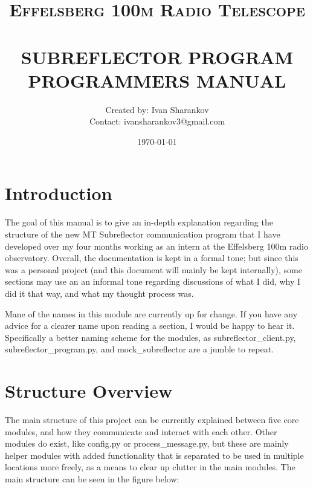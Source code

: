\documentclass{article}
\title{ \normalsize \textsc{Effelsberg 100m Radio Telescope}
		\\ [2.0cm]
		\HRule{0.5pt} \\
		\LARGE \textbf{\uppercase{Subreflector Program \\Programmers Manual}}
		\HRule{2pt} \\ [0.5cm]
		}
\author{
		Created by: Ivan Sharankov \\ 
		Contact: ivansharankov3@gmail.com \\
		}
\date{\today}
\begin{document}
\maketitle
\newpage

\tableofcontents
\newpage




\section{Introduction}

The goal of this manual is to give an in-depth explanation regarding the structure of the new MT Subreflector communication program that I have developed over my four months working as an intern at the Effelsberg 100m radio observatory.  Overall, the documentation  is kept in a formal tone; but since this was a personal project (and this document will mainly be kept internally), some sections may use an an informal tone regarding discussions of what I did, why I did it that way, and what my thought process was. 

\vspace{10pt}

Mane of the names in this module are currently up for change. If you have any advice for a clearer name upon reading a section, I would be happy to hear it. Specifically a better naming scheme for the modules, as subreflector\_client.py, subreflector\_program.py, and mock\_subreflector are a jumble to repeat.


\newpage
\section{Structure Overview}

The main structure of this project can be currently explained between five core modules, and how they communicate and interact with each other. Other modules do exist, like config.py or process\_message.py, but these are mainly helper modules with added functionality that is separated to be used in multiple locations more freely, as a means to clear up clutter in the main modules. The main structure can be seen in the figure below:

 \vspace{10pt}
\end{document}
